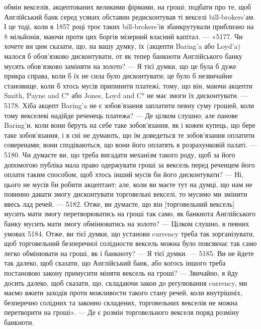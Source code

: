 \parcont{}  %
обмін векселів, акцептованих великими фірмами, на гроші; подбати про те,
щоб Англійський банк серед усяких обставин редисконтував ті векселі bill-brokers’ам.
І це тоді, коли в 1857 році троє таких bill-brokers’ів збанкрутували
приблизно на 8 мільйонів, маючи проти цих боргів мізерний власний капітал. —
«5177. Чи хочете ви цим сказати, що, на вашу думку, їх (акцепти Baring'a або
Loyd’a) малося б обов’язково дисконтувати, от як тепер банкноти Англійського
банку мусять обов’язково заміняти на золото? — Я тієї думки, що це була б
дуже прикра справа, коли б їх не сила було дисконтувати; це було б незвичайне
становище, коли б хтось мусів припинити платежі, тому, що він, маючи акцепти
Smith, Payne and C° або Jones, Loyd and C° не має змоги їх дисконтувати. — 5178.
Хіба акцепт Baring’a не є зобов’язання заплатити певну суму грошей, коли тому
векселеві надійде реченець платежа? — Де цілком слушно; але панове Baring’и.
коли вони беруть на себе таке зобов’язання, як і кожен купець, що бере таке
зобов’язання, і в сні не думають, що їм доведеться те зобов’язання оплатити
соверенами; вони сподіваються, що вони його оплатять в розрахунковій палаті. —
5180. Чи думаєте ви, що треба вигадати механізм такого роду, щоб за його
допомогою публіка мала право одержувати гроші за вексель перед реченцем його
оплати таким способом, щоб хтось інший мусів би його дисконтувати? —
Ні, цього не мусів би робити акцептант; але, коли ви маєте тут на думці, що
нам не повинно давати змогу дисконтувати торговельні векселі, то мусимо ми змінити
ввесь лад речей. — 5182. Отже, ви думаєте, що він [торговельний вексель] мусить
мати змогу перетворюватись на гроші так само, як банкнота Англійського банку
мусить мати змогу обмінюватись на золото? — Цілком слушно, в певних умовах
5184. Отже, ви тієї думки, що установи currency треба так зорганізувати, щоб торговельний
безперечної солідности вексель можна було повсякчас так само легко
обмінювати на гроші, як і банкноту? — Я тієї думки. — 5185. Ви не йдете так
далеко, щоб сказати, що Англійський банк, або когось іншого треба постановою
закону примусити міняти вексель на гроші? — Звичайно, я йду досить далеко,
щоб сказати, що, складаючи закон до реґулювання currency, ми маємо вжити
заходів проти можливости такого стану речей, коли внутрішніх, безперечно
солідних та законно складених, торговельних векселів не можна перетворити
на гроші». — Де є розмін торговельного векселя поряд розміну банкноти.

